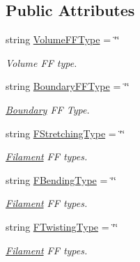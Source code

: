 \subsection*{Public Attributes}
\begin{DoxyCompactItemize}
\item 
string \hyperlink{structMechanicsFFType_a5f694c3765d3856e1987c22d167490a7}{Volume\+F\+F\+Type} = \char`\"{}\char`\"{}
\begin{DoxyCompactList}\small\item\em Volume F\+F type. \end{DoxyCompactList}\item 
string \hyperlink{structMechanicsFFType_ad83b593a03dacd9224f526da4714aa25}{Boundary\+F\+F\+Type} = \char`\"{}\char`\"{}
\begin{DoxyCompactList}\small\item\em \hyperlink{classBoundary}{Boundary} F\+F Type. \end{DoxyCompactList}\end{DoxyCompactItemize}
{\bf }\par
\begin{DoxyCompactItemize}
\item 
string \hyperlink{structMechanicsFFType_ad887670c75c1e05b77187cdae1c849fa}{F\+Stretching\+Type} = \char`\"{}\char`\"{}
\begin{DoxyCompactList}\small\item\em \hyperlink{classFilament}{Filament} F\+F types. \end{DoxyCompactList}\item 
string \hyperlink{structMechanicsFFType_acbd0076ef804005b56b6db07dce03589}{F\+Bending\+Type} = \char`\"{}\char`\"{}
\begin{DoxyCompactList}\small\item\em \hyperlink{classFilament}{Filament} F\+F types. \end{DoxyCompactList}\item 
string \hyperlink{structMechanicsFFType_a7cde64b003b7a90a9f3fa13b5dbe573f}{F\+Twisting\+Type} = \char`\"{}\char`\"{}
\begin{DoxyCompactList}\small\item\em \hyperlink{classFilament}{Filament} F\+F types. \end{DoxyCompactList}\end{DoxyCompactItemize}

